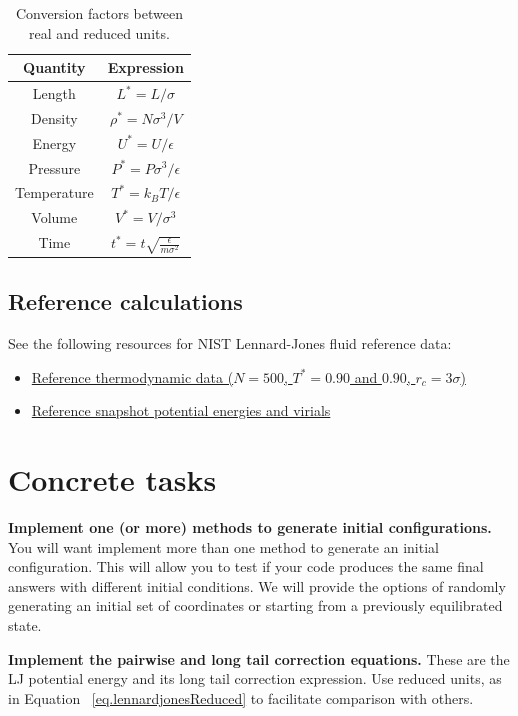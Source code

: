 \documentclass[aip,jcp,preprint,superscriptaddress,floatfix]{revtex4-1}
\begin{document}
\begin{table}[t]
\centering
 \begin{tabular}{|c c|} 
 \hline
 Quantity & Expression \\ [0.5ex] 
 \hline\hline
 Length &  $L^*=L / \sigma$   \\ 
 Density &  $\rho^* = N \sigma^3 / V$   \\
 Energy &  $U^* = U / \epsilon$   \\
 Pressure &  $P^* = P \sigma^3 / \epsilon$   \\
 Temperature & $T^* = k_B T / \epsilon$ \\
 Volume & $V^* = V / \sigma^3$ \\
 Time & $t^* = t \sqrt{\frac{\epsilon}{m \sigma^2}}$ \\
 \hline
 \end{tabular}
 \caption{Conversion factors between real and reduced units.}
 \label{table:reducedUnits}
\end{table}

\subsection{Reference calculations}

See the following resources for NIST Lennard-Jones fluid reference data:
\begin{itemize}
\item \href{https://mmlapps.nist.gov/srs/LJ_PURE/mc.htm}{Reference thermodynamic data ($N=500$, $T^*=0.90$ and $0.90$, $r_c = 3\sigma$)}
\item \href{https://www.nist.gov/mml/csd/chemical-informatics-research-group/lennard-jones-fluid-reference-calculations}{Reference snapshot potential energies and virials}
\end{itemize}

\section{Concrete tasks}

\textbf{Implement one (or more) methods to generate initial configurations. }
You will want implement more than one method to generate an initial
configuration. This will allow you to test if your code produces the same
final answers with different initial conditions. We will provide the options
of randomly generating an initial set of coordinates or starting from a
previously equilibrated state. 

\textbf{Implement the pairwise and long tail correction equations. } 
These are the LJ potential energy and its 
long tail correction expression. Use reduced units, 
as in Equation ~\ref{eq.lennardjonesReduced} to facilitate comparison with
others.
\end{document}

